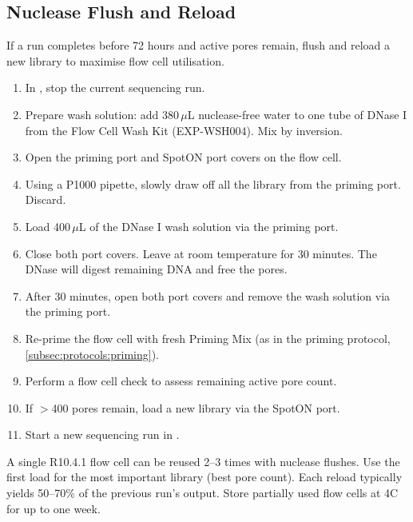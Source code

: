 \subsection{Nuclease Flush and Reload}
\label{subsec:protocols:flush}

If a run completes before 72 hours and active pores remain, flush and reload a new library to maximise flow cell utilisation.

\begin{protocolbox}[title={Protocol: Nuclease Flush and Reload}]
\begin{enumerate}[nosep]
  \item In , stop the current sequencing run.
  \item Prepare wash solution: add 380\,$\mu$L nuclease-free water to one tube of DNase I from the Flow Cell Wash Kit (EXP-WSH004). Mix by inversion.
  \item Open the priming port and SpotON port covers on the flow cell.
  \item Using a P1000 pipette, slowly draw off all the library from the priming port. Discard.
  \item Load 400\,$\mu$L of the DNase I wash solution via the priming port.
  \item Close both port covers. Leave at room temperature for 30 minutes. The DNase will digest remaining DNA and free the pores.
  \item After 30 minutes, open both port covers and remove the wash solution via the priming port.
  \item Re-prime the flow cell with fresh Priming Mix (as in the priming protocol, \cref{subsec:protocols:priming}).
  \item Perform a flow cell check to assess remaining active pore count.
  \item If $>$400 pores remain, load a new library via the SpotON port.
  \item Start a new sequencing run in .
\end{enumerate}
\end{protocolbox}
\begin{tipbox}[title={Maximising Flow Cell Value}]
A single R10.4.1 flow cell can be reused 2--3 times with nuclease flushes. Use the first load for the most important library (best pore count). Each reload typically yields 50--70\% of the previous run's output. Store partially used flow cells at 4\textdegree C for up to one week.
\end{tipbox}

